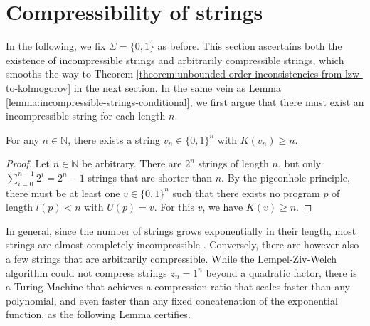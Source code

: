 \section{Compressibility of strings}
\label{sec:compressibility}
In the following, we fix $\Sigma=\{0,1\}$ as before.
This section ascertains both the existence of incompressible strings and arbitrarily compressible strings, which smooths the way to Theorem \ref{theorem:unbounded-order-inconsistencies-from-lzw-to-kolmogorov} in the next section.
In the same vein as Lemma \ref{lemma:incompressible-strings-conditional}, we first argue that there must exist an incompressible string for each length $n$.
\begin{lemma}
	\label{lemma:incompressible-strings}
	For any $n\in\mathbb{N}$, there exists a string $v_n\in\{0,1\}^n$ with $K(v_n)\geq n$.
\end{lemma}
\begin{proof}
	Let $n\in\mathbb{N}$ be arbitrary.
	There are $2^n$ strings of length $n$, but only $\sum_{i=0}^{n-1}2^i=2^{n}-1$ strings that are shorter than $n$. 
	By the pigeonhole principle, there must be at least one $v\in\{0,1\}^n$ such that there exists no program $p$ of length $l(p)<n$ with $U(p)=v$.
	For this $v$, we have $K(v)\geq n$.
\end{proof}
In general, since the number of strings grows exponentially in their length, most strings are almost completely incompressible \cite{li2008kolmogorov}. 
Conversely, there are however also a few strings that are arbitrarily compressible.
While the Lempel-Ziv-Welch algorithm could not compress strings $z_n=1^n$ beyond a quadratic factor, there is a Turing Machine that achieves a compression ratio that scales faster than any polynomial, and even faster than any fixed concatenation of the exponential function, as the following Lemma certifies.

